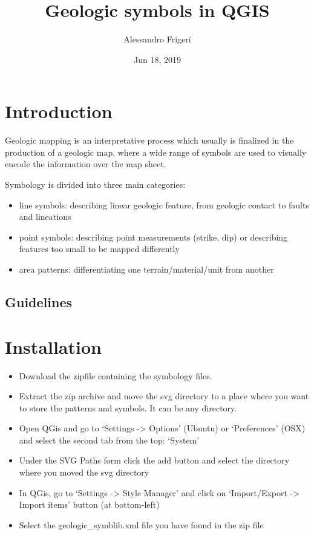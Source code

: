 \documentclass[letterpaper,10pt,english]{sphinxmanual}
\title{Geologic symbols in QGIS}
\date{Jun 18, 2019}
\author{Alessandro Frigeri}
\begin{document}
\pagestyle{empty}
\sphinxmaketitle
\pagestyle{plain}
\sphinxtableofcontents
\pagestyle{normal}
\label{\detokenize{index::doc}}



\chapter{Introduction}
\label{\detokenize{intro:introduction}}\label{\detokenize{intro::doc}}
Geologic mapping is an interpretative process which usually is finalized in the production of a geologic map, where a wide range of symbols are used to visually encode the information over the map sheet.

Symbology is divided into three main categories:
\begin{itemize}
\item {} 
line symbols: describing linear geologic feature, from geologic contact to faults and lineations

\item {} 
point symbols: describing point measurements (strike, dip) or describing features too small to be mapped differently

\item {} 
area patterns: differentiating one terrain/material/unit from another

\end{itemize}


\section{Guidelines}
\label{\detokenize{intro:guidelines}}

\chapter{Installation}
\label{\detokenize{installation:installation}}\label{\detokenize{installation::doc}}\begin{itemize}
\item {} 
Download the zipfile containing the symbology files.

\item {} 
Extract the zip archive and move the svg directory to a place where you want to store the patterns and symbols. It can be any directory.

\item {} 
Open QGis and go to ‘Settings -\textgreater{} Options’ (Ubuntu) or ‘Preferences’ (OSX) and select the second tab from the top: ‘System’

\item {} 
Under the SVG Paths form click the add button and select the directory where you moved the svg directory

\item {} 
In QGis, go to ‘Settings -\textgreater{} Style Manager’ and click on ‘Import/Export -\textgreater{} Import items’ button (at bottom-left)

\item {} 
Select the geologic\_symblib.xml file you have found in the zip file

\end{itemize}
\end{document}
